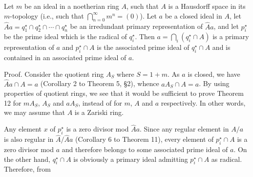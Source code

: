 Let $m$ be an ideal in a noetherian ring $A$, such that $A$ is a Hausdorff space in its $m$-topology (i.e., such that $\bigcap_{n=0}^{\infty} m^n = (0)$). Let $a$ be a closed ideal in $A$, let $\hat{A}a = q_1^\star \cap q_2^\star \cap \cdots \cap q_n^\star$ be an irredundant primary representation of $\hat{A}a$, and let $p_i^\star$ be the prime ideal which is the radical of $q_i^\star$. Then $a = \bigcap_i (q_i^\star \cap A)$ is a primary representation of $a$ and $p_i^\star \cap A$ is the associated prime ideal of $q_i^\star \cap A$ and is contained in an associated prime ideal of $a$.

Proof. Consider the quotient ring $A_S$ where $S = 1 + m$. As $a$ is closed, we have $\hat{A}a \cap A = a$ (Corollary 2 to Theorem 5, §2), whence $aA_S \cap A = a$. By using properties of quotient rings, we see that it would be sufficient to prove Theorem 12 for $mA_S$, $A_S$ and $aA_S$, instead of for $m$, $A$ and $a$ respectively. In other words, we may assume that $A$ is a Zariski ring.

Any element $x$ of $p_i^\star$ is a zero divisor mod $\hat{A}a$. Since any regular element in $A/a$ is also regular in $\hat{A}/\hat{A}a$ (Corollary 6 to Theorem 11), every element of $p_i^\star \cap A$ is a zero divisor mod $a$ and therefore belongs to some associated prime ideal of $a$. On the other hand, $q_i^\star \cap A$ is obviously a primary ideal admitting $p_i^\star \cap A$ as radical. Therefore, from